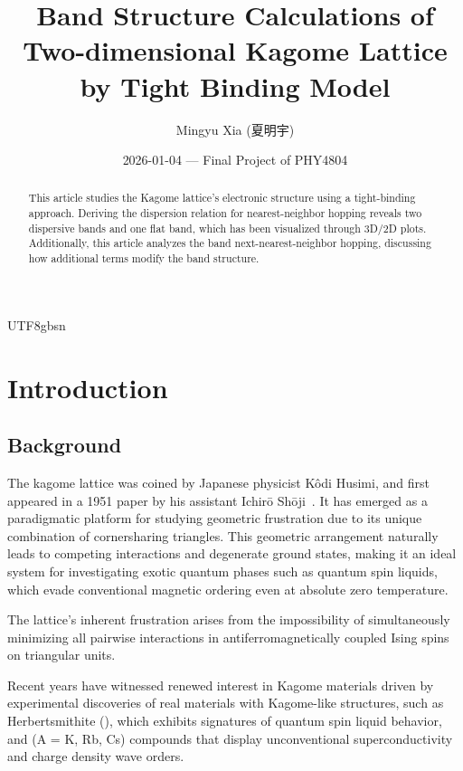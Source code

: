 \documentclass[ preprint, numerical, superscriptaddress, svgnames,
                amssymb, aps, prb ]{revtex4-2}
\renewcommand *\theequation{\arabic{section}.\arabic{equation}}
\begin{document}
\title{Band Structure Calculations of Two-dimensional Kagome Lattice by Tight
  Binding Model}
\author{Mingyu Xia (夏明宇)}
\date{2026-01-04 --- Final Project of PHY4804}

\begin{abstract}
  This article studies the Kagome lattice's electronic structure using a
  tight-binding approach. Deriving the dispersion relation for nearest-neighbor
  hopping reveals two dispersive bands and one flat band, which has been
  visualized through 3D/2D plots. Additionally, this article analyzes the band
  next-nearest-neighbor hopping, discussing how additional terms modify the
  band structure.
\end{abstract}

\begin{CJK*}{UTF8}{gbsn}
\maketitle
\end{CJK*}

\section{Introduction}

\subsection{Background}

The kagome lattice was coined by Japanese physicist Kôdi Husimi, and first
appeared in a 1951 paper by his assistant Ichirō Shōji~\cite{WikipediA}.
It has emerged as a paradigmatic platform for studying
geometric frustration due to its unique combination of cornersharing triangles.
This geometric arrangement naturally leads to competing interactions and
degenerate ground states, making it an ideal system for investigating exotic
quantum phases such as quantum spin liquids, which evade conventional magnetic
ordering even at absolute zero temperature.

The lattice's inherent frustration arises from the impossibility of
simultaneously minimizing all pairwise interactions in antiferromagnetically
coupled Ising spins on triangular units.

Recent years have witnessed renewed interest in Kagome materials driven by
experimental discoveries of real materials with Kagome-like structures, such as
Herbertsmithite (), which exhibits signatures of quantum spin
liquid behavior, and  (A = K, Rb, Cs) compounds that display
unconventional superconductivity and charge density wave orders.
\end{document}

